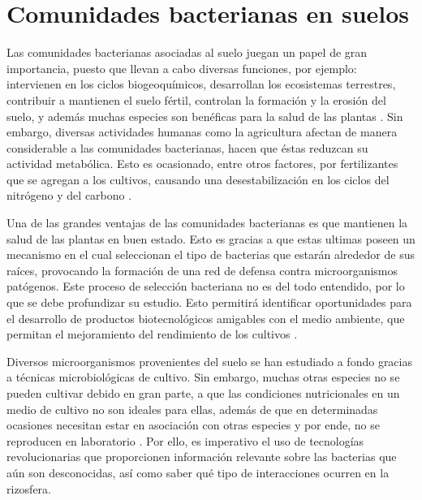 \documentclass[12pt,letterpaper,oneside]{report}
\begin{document}
\section{Comunidades bacterianas en suelos}
Las comunidades bacterianas asociadas al suelo juegan un papel de gran importancia, puesto que llevan a cabo diversas funciones, por ejemplo: intervienen en los ciclos biogeoquímicos, desarrollan los ecosistemas terrestres, contribuir a mantienen el suelo fértil, controlan la formación y la erosión del suelo, y además muchas especies son benéficas para la salud de las plantas \autocite{Buckley2003,Castaneda2017,Tecon2017}. Sin embargo, diversas actividades humanas como la agricultura afectan de manera considerable a las comunidades bacterianas, hacen que éstas reduzcan su actividad metabólica. Esto es ocasionado, entre otros factores, por fertilizantes que se agregan a los cultivos, causando una desestabilización en los ciclos del nitrógeno y del carbono \autocite{Alvarez-Yela2017}.
\par 
Una de las grandes ventajas de las comunidades bacterianas es que mantienen la salud de las plantas en buen estado. Esto es gracias a que estas ultimas poseen un mecanismo en el cual seleccionan el tipo de bacterias que estarán alrededor de sus raíces, provocando la formación de una red de defensa contra microorganismos patógenos. Este proceso de selección bacteriana no es del todo entendido, por lo que se debe profundizar su estudio. Esto permitirá identificar oportunidades para el desarrollo de productos biotecnológicos amigables con el medio ambiente, que permitan el mejoramiento del rendimiento de los cultivos \autocite{Berendsen2012,Berg2009}.
\par
Diversos microorganismos provenientes del suelo se han estudiado a fondo gracias a técnicas microbiológicas de cultivo. Sin embargo, muchas otras especies no se pueden cultivar debido en gran parte, a que las condiciones nutricionales en un medio de cultivo no son ideales para ellas, además de que en determinadas ocasiones necesitan estar en asociación con otras especies y por ende, no se reproducen en laboratorio \autocite{Stewart2012}. Por ello, es imperativo el uso de tecnologías revolucionarias que proporcionen información relevante sobre las bacterias que aún son desconocidas, así como saber qué tipo de interacciones ocurren en la rizosfera.
\end{document}
